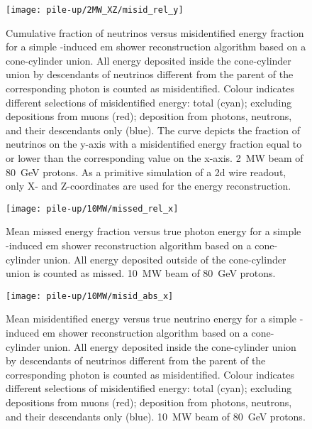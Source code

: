 \begin{figure}[htb]
	\centering
	\texttt{[image: pile-up/2MW\_XZ/misid\_rel\_y]}
	\caption[Pile-up study neutrino vs.\ misidentified energy fraction, \SI{2}{\mega\watt} beam, XZ projection]{%
		Cumulative fraction of neutrinos versus misidentified energy fraction for a simple \Pgpz-induced \acrshort{em} shower reconstruction algorithm based on a cone-cylinder union.
		All energy deposited inside the cone-cylinder union by descendants of neutrinos different from the parent of the corresponding \Pgpz photon is counted as misidentified.
		Colour indicates different selections of misidentified energy: total (cyan); excluding depositions from muons (red); deposition from photons, neutrons, and their descendants only (blue).
		The curve depicts the fraction of neutrinos on the y-axis with a misidentified energy fraction equal to or lower than the corresponding value on the x-axis.
		\SI{2}{\mega\watt} beam of \SI{80}{\giga\electronvolt} protons.
		As a primitive simulation of a \acrshort{2d} wire readout, only X- and Z-coordinates are used for the energy reconstruction.
	}
	\label{fig:dune-nd_2MW-XZ_misid-rel-y}
\end{figure}

\begin{figure}[htb]
	\centering
	\texttt{[image: pile-up/10MW/missed\_rel\_x]}
	\caption[Pile-up study mean missed fractional vs.\ true photon energy, \SI{10}{\mega\watt} beam]{%
		Mean missed energy fraction versus true photon energy for a simple \Pgpz-induced \acrshort{em} shower reconstruction algorithm based on a cone-cylinder union.
		All energy deposited outside of the cone-cylinder union is counted as missed.
		\SI{10}{\mega\watt} beam of \SI{80}{\giga\electronvolt} protons.
	}
	\label{fig:dune-nd_10MW_missed-rel-x}
\end{figure}

\begin{figure}[htb]
	\centering
	\texttt{[image: pile-up/10MW/misid\_abs\_x]}
	\caption[Pile-up study mean misidentified vs.\ true neutrino energy, \SI{10}{\mega\watt} beam]{%
		Mean misidentified energy versus true neutrino energy for a simple \Pgpz-induced \acrshort{em} shower reconstruction algorithm based on a cone-cylinder union.
		All energy deposited inside the cone-cylinder union by descendants of neutrinos different from the parent of the corresponding \Pgpz photon is counted as misidentified.
		Colour indicates different selections of misidentified energy: total (cyan); excluding depositions from muons (red); deposition from photons, neutrons, and their descendants only (blue).
		\SI{10}{\mega\watt} beam of \SI{80}{\giga\electronvolt} protons.
	}
	\label{fig:dune-nd_10MW_misid-abs-x}
\end{figure}

